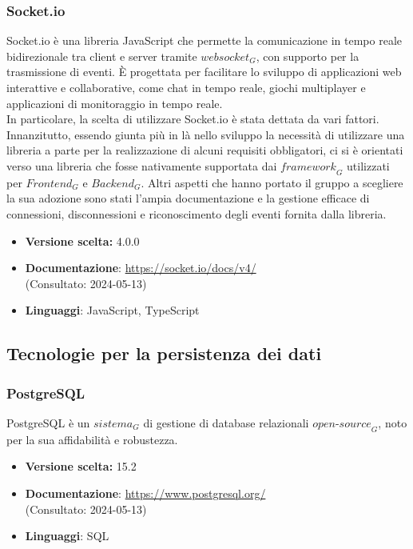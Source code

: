 \subsubsection{Socket.io}
Socket.io è una libreria JavaScript che permette la comunicazione in tempo reale bidirezionale tra client e server tramite $\textit{websocket}_G$, con supporto per la trasmissione di eventi. È progettata per facilitare lo sviluppo di applicazioni web interattive e collaborative, come chat in tempo reale, giochi multiplayer e applicazioni di monitoraggio in tempo reale. \\
In particolare, la scelta di utilizzare Socket.io è stata dettata da vari fattori. Innanzitutto, essendo giunta più in là nello sviluppo la necessità di utilizzare una libreria a parte per la realizzazione di alcuni requisiti obbligatori, ci si è orientati verso una libreria che fosse nativamente supportata dai $\textit{framework}_G$ utilizzati per $\textit{Frontend}_G$ e $\textit{Backend}_G$. Altri aspetti che hanno portato il gruppo a scegliere la sua adozione sono stati l'ampia documentazione e la gestione efficace di connessioni, disconnessioni e riconoscimento degli eventi fornita dalla libreria. 
\begin{itemize}
\item \textbf{Versione scelta:} 4.0.0
\item \textbf{Documentazione}: \url{https://socket.io/docs/v4/}\\
(Consultato: 2024-05-13)
\item \textbf{Linguaggi}: JavaScript, TypeScript
\end{itemize}

\subsection{Tecnologie per la persistenza dei dati}
\subsubsection{PostgreSQL}
PostgreSQL è un $\textit{sistema}_G$ di gestione di database relazionali $\textit{open-source}_G$, noto per la sua affidabilità e robustezza.
\begin{itemize}
\item \textbf{Versione scelta:} 15.2
\item \textbf{Documentazione}: \url{https://www.postgresql.org/}\\
(Consultato: 2024-05-13)
\item \textbf{Linguaggi}: SQL
\end{itemize}


